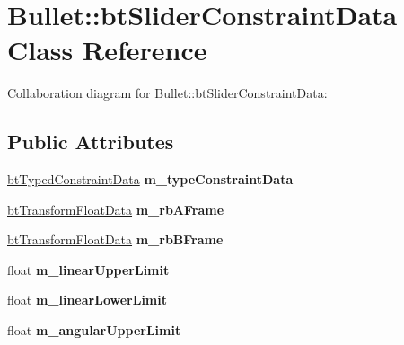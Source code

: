 \hypertarget{class_bullet_1_1bt_slider_constraint_data}{\section{Bullet\+:\+:bt\+Slider\+Constraint\+Data Class Reference}
\label{class_bullet_1_1bt_slider_constraint_data}
}


Collaboration diagram for Bullet\+:\+:bt\+Slider\+Constraint\+Data\+:
\subsection*{Public Attributes}
\begin{DoxyCompactItemize}
\item 
\hypertarget{class_bullet_1_1bt_slider_constraint_data_adb2234157743debccbf231ee924be186}{\hyperlink{class_bullet_1_1bt_typed_constraint_data}{bt\+Typed\+Constraint\+Data} {\bfseries m\+\_\+type\+Constraint\+Data}}\label{class_bullet_1_1bt_slider_constraint_data_adb2234157743debccbf231ee924be186}

\item 
\hypertarget{class_bullet_1_1bt_slider_constraint_data_a6c537766f0f60a6a74687b124d5acd90}{\hyperlink{class_bullet_1_1bt_transform_float_data}{bt\+Transform\+Float\+Data} {\bfseries m\+\_\+rb\+A\+Frame}}\label{class_bullet_1_1bt_slider_constraint_data_a6c537766f0f60a6a74687b124d5acd90}

\item 
\hypertarget{class_bullet_1_1bt_slider_constraint_data_a0a0b8a1c4a4255212b95eb90c576f508}{\hyperlink{class_bullet_1_1bt_transform_float_data}{bt\+Transform\+Float\+Data} {\bfseries m\+\_\+rb\+B\+Frame}}\label{class_bullet_1_1bt_slider_constraint_data_a0a0b8a1c4a4255212b95eb90c576f508}

\item 
\hypertarget{class_bullet_1_1bt_slider_constraint_data_a1ab36c11cebc09c4a75572c24fb71e98}{float {\bfseries m\+\_\+linear\+Upper\+Limit}}\label{class_bullet_1_1bt_slider_constraint_data_a1ab36c11cebc09c4a75572c24fb71e98}

\item 
\hypertarget{class_bullet_1_1bt_slider_constraint_data_a6b854b5a01ef87d91d195961ec0fa3b7}{float {\bfseries m\+\_\+linear\+Lower\+Limit}}\label{class_bullet_1_1bt_slider_constraint_data_a6b854b5a01ef87d91d195961ec0fa3b7}

\item 
\hypertarget{class_bullet_1_1bt_slider_constraint_data_a08a00970c783b75649dd5c3fd9cb7f61}{float {\bfseries m\+\_\+angular\+Upper\+Limit}}\label{class_bullet_1_1bt_slider_constraint_data_a08a00970c783b75649dd5c3fd9cb7f61}


\end{DoxyCompactItemize}

